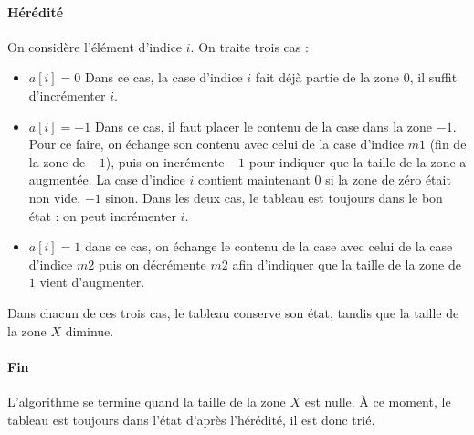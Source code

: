 \paragraph{Hérédité} On considère l'élément d'indice $i$. On traite trois cas :
\begin{itemize}
    \item $a[i] = 0$ Dans ce cas, la case d'indice $i$ fait déjà partie de la
        zone $0$, il suffit d'incrémenter $i$.
    \item $a[i] = -1$ Dans ce cas, il faut placer le contenu de la case dans la
        zone $-1$. Pour ce faire, on échange son contenu avec celui de la case
        d'indice $m1$ (fin de la zone de $-1$), puis on incrémente $-1$ pour
        indiquer que la taille de la zone a augmentée. La case d'indice $i$
        contient maintenant $0$ si la zone de zéro était non vide, $-1$ sinon.
        Dans les deux cas, le tableau est toujours dans le bon état : on peut
        incrémenter $i$.
    \item $a[i] = 1$ dans ce cas, on échange le contenu de la case avec celui
        de la case d'indice $m2$ puis on décrémente $m2$ afin d'indiquer que la
        taille de la zone de $1$ vient d'augmenter.
\end{itemize}
Dans chacun de ces trois cas, le tableau conserve son état, tandis que la
taille de la zone $X$ diminue.

\paragraph{Fin} L'algorithme se termine quand la taille de la zone $X$ est
nulle. À ce moment, le tableau est toujours dans l'état d'après l'hérédité, il
est donc trié.

